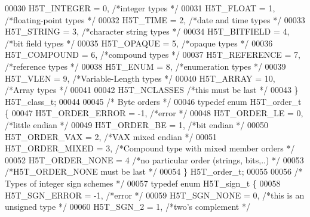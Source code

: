 \begin{DoxyCode}
00030     H5T\_INTEGER          = 0,   \textcolor{comment}{/*integer types                              */}
00031     H5T\_FLOAT            = 1,   \textcolor{comment}{/*floating-point types                       */}
00032     H5T\_TIME             = 2,   \textcolor{comment}{/*date and time types                        */}
00033     H5T\_STRING           = 3,   \textcolor{comment}{/*character string types                     */}
00034     H5T\_BITFIELD         = 4,   \textcolor{comment}{/*bit field types                            */}
00035     H5T\_OPAQUE           = 5,   \textcolor{comment}{/*opaque types                               */}
00036     H5T\_COMPOUND         = 6,   \textcolor{comment}{/*compound types                             */}
00037     H5T\_REFERENCE        = 7,   \textcolor{comment}{/*reference types                            */}
00038     H5T\_ENUM         = 8,   \textcolor{comment}{/*enumeration types                          */}
00039     H5T\_VLEN         = 9,   \textcolor{comment}{/*Variable-Length types                      */}
00040     H5T\_ARRAY            = 10,  \textcolor{comment}{/*Array types                                */}
00041 
00042     H5T\_NCLASSES                \textcolor{comment}{/*this must be last                          */}
00043 \} H5T\_class\_t;
00044 
00045 \textcolor{comment}{/* Byte orders */}
00046 \textcolor{keyword}{typedef} \textcolor{keyword}{enum} H5T\_order\_t \{
00047     H5T\_ORDER\_ERROR      = -1,  \textcolor{comment}{/*error                                      */}
00048     H5T\_ORDER\_LE         = 0,   \textcolor{comment}{/*little endian                              */}
00049     H5T\_ORDER\_BE         = 1,   \textcolor{comment}{/*bit endian                                 */}
00050     H5T\_ORDER\_VAX        = 2,   \textcolor{comment}{/*VAX mixed endian                           */}
00051     H5T\_ORDER\_MIXED      = 3,   \textcolor{comment}{/*Compound type with mixed member orders     */}
00052     H5T\_ORDER\_NONE       = 4    \textcolor{comment}{/*no particular order (strings, bits,..)     */}
00053     \textcolor{comment}{/*H5T\_ORDER\_NONE must be last */}
00054 \} H5T\_order\_t;
00055 
00056 \textcolor{comment}{/* Types of integer sign schemes */}
00057 \textcolor{keyword}{typedef} \textcolor{keyword}{enum} H5T\_sign\_t \{
00058     H5T\_SGN\_ERROR        = -1,  \textcolor{comment}{/*error                                      */}
00059     H5T\_SGN\_NONE         = 0,   \textcolor{comment}{/*this is an unsigned type                   */}
00060     H5T\_SGN\_2            = 1,   \textcolor{comment}{/*two's complement                           */}

\end{DoxyCode}

